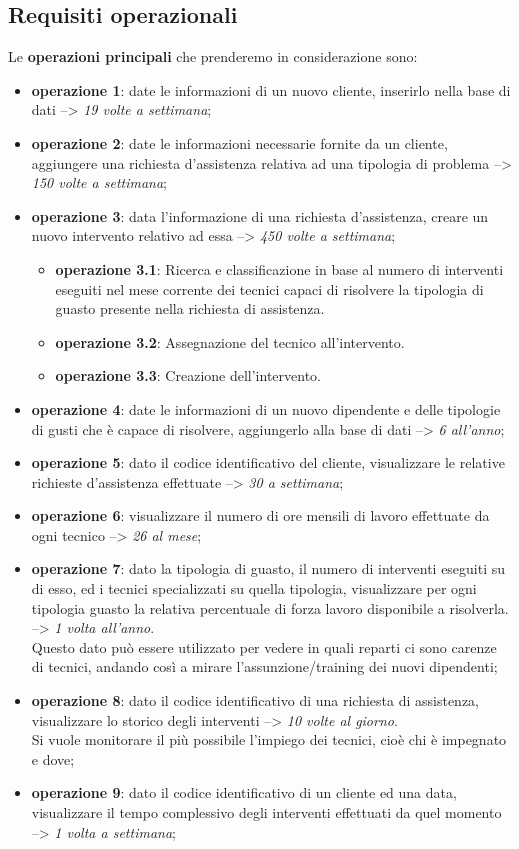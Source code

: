 \documentclass[legalpaper]{article}
\begin{document}
	\subsection{Requisiti operazionali}
	Le \textbf{operazioni principali} che prenderemo in considerazione sono:
	\begin{itemize}
		\item \textbf{operazione 1}: date le informazioni di un nuovo cliente, inserirlo nella base di dati --> \textit{19 volte a settimana};
		\item \textbf{operazione 2}: date le informazioni necessarie fornite da un cliente, aggiungere una richiesta d'assistenza relativa ad una tipologia di problema --> \textit{150 volte a settimana};
		\item \textbf{operazione 3}: data l'informazione di una richiesta d'assistenza, creare un nuovo intervento relativo ad essa --> \textit{450 volte a settimana};
		\begin{itemize}
			\item \textbf{operazione 3.1}: Ricerca e classificazione in base al numero di interventi eseguiti nel mese corrente dei tecnici capaci di risolvere la tipologia di guasto presente nella richiesta di assistenza.
			\item \textbf{operazione 3.2}: Assegnazione del tecnico all'intervento.
			\item \textbf{operazione 3.3}: Creazione dell'intervento.
		\end{itemize}
		\item \textbf{operazione 4}: date le informazioni di un nuovo dipendente e delle tipologie di gusti che è capace di risolvere, aggiungerlo alla base di dati --> \textit{6 all'anno};
		\item \textbf{operazione 5}: dato il codice identificativo del cliente, visualizzare le relative richieste d'assistenza effettuate --> \textit{30 a settimana};
		\item \textbf{operazione 6}: visualizzare il numero di ore mensili di lavoro effettuate da ogni tecnico --> \textit{26 al mese};
		\item \textbf{operazione 7}: dato la tipologia di guasto, il numero di interventi eseguiti su di esso, ed i tecnici specializzati su quella tipologia, visualizzare per ogni tipologia guasto la relativa percentuale di forza lavoro disponibile a risolverla.  --> \textit{1 volta all'anno}. \\ Questo dato può essere utilizzato per vedere in quali reparti ci sono carenze di tecnici, andando così a mirare l'assunzione/training dei nuovi dipendenti;
		\item \textbf{operazione 8}: dato il codice identificativo di una richiesta di assistenza, visualizzare lo storico degli interventi --> \textit{10 volte al giorno}. \\Si vuole monitorare il più possibile l'impiego dei tecnici, cioè chi è impegnato e dove;
		\item \textbf{operazione 9}: dato il codice identificativo di un cliente ed una data, visualizzare il tempo complessivo degli interventi effettuati da quel momento --> \textit{1 volta a settimana};
		
	\end{itemize}
\end{document}
